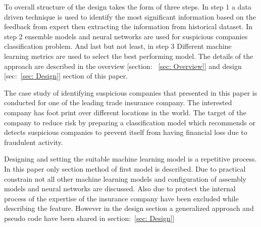 To overall structure of the design takes the form of three steps. In step 1 a data driven technique is used to identify the most significant information based on the feedback from expert then extracting the information from historical dataset. In step 2 ensemble models and neural networks are used for suspicious companies classification problem. And last but not least, in step 3 Different machine learning metrics are used to select the best performing model. The details of the approach are described in the overview [section: ~\ref{sec: Overview}] and design [sec:~\ref{sec: Design}] section of this paper.


The case study of identifying suspicious companies that presented in this paper is conducted for one of the leading trade insurance company. The interested company has foot print over different locations in the world. The target of the company to reduce risk by preparing a classification model which recommends or detects suspicious companies to prevent itself from having financial loss due to fraudulent activity.


Designing and setting the suitable machine learning model is a repetitive process. In this paper only section method of first model is described. Due to practical constrain not all other machine learning models and configuration of assembly models and neural networks are discussed. Also due to protect the internal process of the expertise of the insurance company have been excluded while describing the feature. However in the design section a generalized approach and pseudo code have been shared in section:~\ref{sec: Design}]






